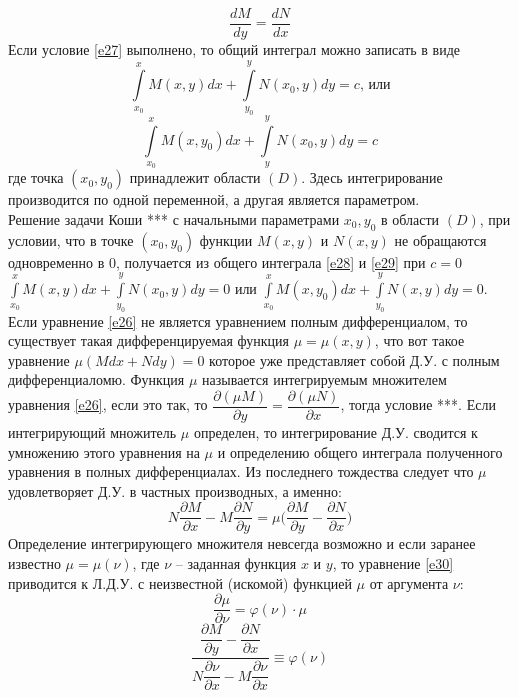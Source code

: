 \documentclass{article}
\numberwithin{equation}{section}
\begin{document}
\begin{equation}\label{e27}
\dfrac{dM}{dy}=\dfrac{dN}{dx}
\end{equation}
Если условие \eqref{e27} выполнено, то общий интеграл можно записать в виде
\begin{equation}\label{e28}
\int\limits_{x_0}^xM(x,y)dx+\int\limits_{y_0}^yN(x_0,y)dy=c\mbox{, или}
\end{equation}
\begin{equation}\label{e29}
\int\limits_{x_0}^xM(x,y_0)dx+\int\limits_{y}^yN(x_0,y)dy=c
\end{equation}
где точка $(x_0,y_0)$ принадлежит области $(D)$. Здесь интегрирование производится по одной переменной, а другая является параметром.\\
Решение задачи Коши \colorbox{red!50}{***} с начальными параметрами $x_0, y_0$ в области $(D)$, при условии, что в точке $(x_0,y_0)$ функции $M(x,y)$ и $N(x,y)$ не обращаются одновременно в 0, получается из общего интеграла \eqref{e28} и \eqref{e29} при $c=0$ $\int\limits_{x_0}^xM(x,y)dx+\int\limits_{y_0}^yN(x_0,y)dy=0$ или $\int\limits_{x_0}^xM(x,y_0)dx+\int\limits_{y_0}^yN(x,y)dy=0$. Если уравнение \eqref{e26} не является уравнением полным дифференциалом, то существует такая дифференцируемая функция $\mu=\mu(x,y)$, что вот такое уравнение $\mu(Mdx+Ndy)=0$ которое уже представляет собой Д.У. с полным дифференциаломю.  Функция $\mu$ называется интегрируемым множителем уравнения \eqref{e26}, если это так, то $\dfrac{\partial(\mu M)}{\partial y}=\dfrac{\partial(\mu N)}{\partial x}$, тогда условие \colorbox{red!50}{***}. Если интегрирующий множитель $\mu$ определен, то интегрирование Д.У. сводится к умножению этого уравнения на $\mu$ и определению общего интеграла полученного уравнения в полных дифференциалах. Из последнего тождества следует что $\mu$ удовлетворяет Д.У. в частных производных, а именно:
\begin{equation}\label{e30}
N\dfrac{\partial M}{\partial x}-M\dfrac{\partial N}{\partial y}=\mu\bigg(\dfrac{\partial M}{\partial y}-\dfrac{\partial N}{\partial x}\bigg)
\end{equation}
Определение интегрирующего множителя невсегда возможно и если заранее известно $\mu=\mu(\nu)$, где $\nu$ -- заданная функция $x$ и $y$, то уравнение \eqref{e30} приводится к Л.Д.У. с неизвестной (искомой) функцией $\mu$ от аргумента $\nu$:
\begin{equation}\label{e31}
\dfrac{\partial\mu}{\partial\nu}=\varphi(\nu)\cdot\mu
\end{equation}
\begin{equation}\label{e32}
\dfrac{\dfrac{\partial M}{\partial y}-\dfrac{\partial N}{\partial x}}{N\dfrac{\partial\nu}{\partial x}-M\dfrac{\partial\nu}{\partial x}}\equiv\varphi(\nu)
\end{equation}
\end{document}
